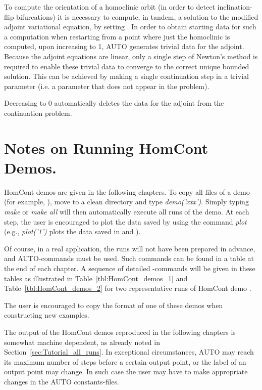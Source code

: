 \documentclass[12pt]{report}
\begin{document}
To compute the orientation of a homoclinic orbit (in order to detect
inclination-flip bifurcations) it is necessary to compute, in tandem,
a solution to the modified adjoint variational equation, by setting
. In order to obtain starting data for such a
computation when restarting from a point where just the homoclinic
is computed, upon increasing  to 1, {\cal AUTO} generates
trivial data for the adjoint. Because the adjoint equations are
linear, only a single step of Newton's method is required to
enable these trivial data to converge to the correct unique bounded
solution. This can be achieved by making a single continuation step in a
trivial parameter (i.e. a parameter that does not appear
in the problem). 

Decreasing  to 0 automatically deletes the data for the adjoint
from the continuation problem.


\section{ Notes on Running {\cal HomCont} Demos.} \label{sec:HomCont_Tutorial_examples}
{\cal HomCont} demos are given in the following chapters.
To copy all files of a demo  (for example, ),
move to a clean directory and type {\it demo('xxx')}.
Simply typing {\it make} or {\it make all} will then automatically
execute all runs of the demo.
At each step, the user is encouraged to plot the data
saved by using the command {\it plot} (e.g., {\it plot('1')} plots the data
saved in  and ).

Of course, in a real application, the runs will not have been prepared
in advance, and {\cal AUTO}-commands must be used.
Such commands can be found in a table at the end of each chapter.
A sequence of detailed \AUTO-commands will be given in these tables
as illustrated in Table~\ref{tbl:HomCont_demos_1}
and Table~\ref{tbl:HomCont_demos_2} for two representative runs of 
{\cal HomCont} demo .


The user is encouraged to copy the format of one of these demos
when constructing new examples.

The output of the {\cal HomCont} demos reproduced in  the following chapters
is somewhat machine dependent, as already noted 
in Section~\ref{sec:Tutorial_all_runs}.
In exceptional circumstances, {\cal AUTO} may reach its maximum number of
steps  before a certain output point, or the label of
an output point may change. In such case the user may have
to make appropriate changes in the {\cal AUTO} constants-files.
\end{document}
